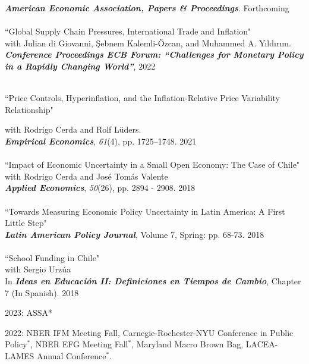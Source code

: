 \documentclass[10pt]{article}
\begin{document}
\begin{description}[leftmargin=10em,style=nextline]
      \textbf{\textit{American Economic Association, Papers \& Proceedings}}. Forthcoming\\
     \\[-0.1in]
      ``Global Supply Chain Pressures, International Trade and Inflation"\\
     with Julian di Giovanni, \c{S}ebnem Kalemli-\"{O}zcan, and Muhammed A. Y{\i}ld{\i}r{\i}m. \\
     \textbf{\textit{Conference Proceedings ECB Forum: ``Challenges for Monetary Policy in a Rapidly Changing World''}}, 2022\\
    \\[-0.2in]
    \item[Pre Ph.D.]
     ``Price Controls, Hyperinflation, and the Inflation-Relative Price Variability Relationship"\\[-.225in]
     \item[Publications]
     with Rodrigo Cerda and Rolf L\"{u}ders. \\
     \textbf{\textit{Empirical Economics}}, \emph{61}(4), pp. 1725--1748. 2021\\
    \\[-0.1in]
     ``Impact of Economic Uncertainty in a Small Open Economy: The Case of Chile"\\
     with Rodrigo Cerda and Jos\'e Tom\'as Valente \\
     \textbf{\textit{Applied Economics}}, \textit{50}(26), pp. 2894 - 2908. 2018\\
    \\[-0.1in]
     ``Towards Measuring Economic Policy Uncertainty in Latin America: A First Little Step" \\
     \textbf{\textit{Latin American Policy Journal}}, Volume 7, Spring: pp. 68-73. 2018\\
    \\[-0.1in]
     ``School Funding in Chile"\\
     with Sergio Urz\'ua \\
     In  \textbf{\textit{Ideas en Educaci\'on II: Definiciones en Tiempos de Cambio}}, Chapter 7 (In Spanish). 2018\\[-0.1in]
     \item[Conference] 
     2023: ASSA*\\[-0.225in]
      \item[Presentations] 2022: NBER IFM Meeting Fall, Carnegie-Rochester-NYU Conference in Public Policy$^\ast$, NBER EFG Meeting Fall$^\ast$, Maryland Macro Brown Bag, LACEA-LAMES Annual Conference$^\ast$.\\

\end{description}
\end{document}
